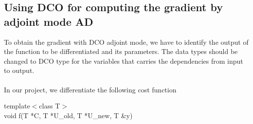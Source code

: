 \documentclass[10pt,a4paper]{report}
\begin{document}
\newpage

\begin{appendices}
\chapter{ Using DCO for computing the gradient by adjoint mode AD}

To obtain the gradient with DCO adjoint mode, we have to identify the output of the function to be differentiated and its parameters. The data types should be changed to DCO type for the variables that carries the dependencies from input to output.\\
\\
In our project, we differentiate the following cost function
\begin{snugshade}
\begin{flushleft}
template$<$class T$>$\\ 
void f(T *C, T *U\_old, T *U\_new, T \&y)
\end{flushleft}
\end{snugshade}


\end{appendices}
\end{document}
